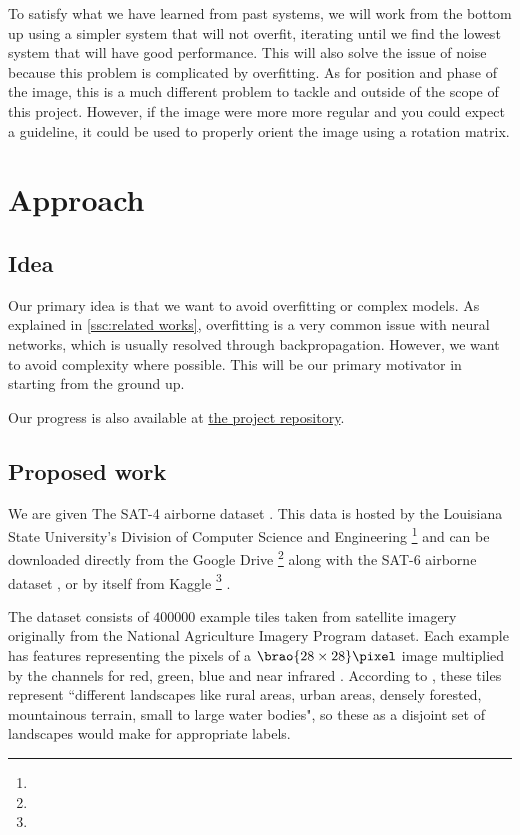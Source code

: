 \documentclass[11pt]{report}
\DeclarePairedDelimiter\brao()%
\begin{document}
To satisfy what we have learned from past systems,
we will work from the bottom up using a simpler system that will not overfit,
iterating until we find the lowest system that will have good performance.
This will also solve the issue of noise because this problem is complicated by overfitting.
As for position and phase of the image, this is a much different problem to tackle and outside of the scope of this project.
However, if the image were more more regular and you could expect a guideline,
it could be used to properly orient the image using a rotation matrix.

\section{Approach}



\subsection{Idea}

Our primary idea is that we want to avoid overfitting or complex models.
As explained in \ref{ssc:related works},
overfitting is a very common issue with neural networks,
which is usually resolved through backpropagation.
However, we want to avoid complexity where possible.
This will be our primary motivator in starting from the ground up.

Our progress is also available at \href{https://github.com/lduran2/CIS3715_DataScience_2022/tree/final/final}{the project repository}.

\subsection{Proposed work}

We are given
The SAT-4 airborne dataset%
\cite{Basu2015a}.
This data is hosted by the Louisiana State University's Division of Computer Science and Engineering%
\footnote{%
}
and can be downloaded directly from the Google Drive%
\footnote{%
}
along with the SAT-6 airborne dataset%
, or by itself from Kaggle%
\footnote{%
}%
.

The dataset consists of \(\num{400000}\) example tiles
taken from satellite imagery originally from the National Agriculture Imagery Program  dataset.
Each example has features representing the pixels of a \(\SI[parse-numbers=false]{\brao{28\times28}\!}\pixel\) image 
multiplied by the channels for red, green, blue and near infrared .
According to \textcite{Basu2015a},
these tiles represent ``different landscapes like rural areas, urban areas, densely forested, mountainous terrain, small to large water bodies",
so these as a disjoint set of landscapes would make for appropriate labels.
\end{document}
